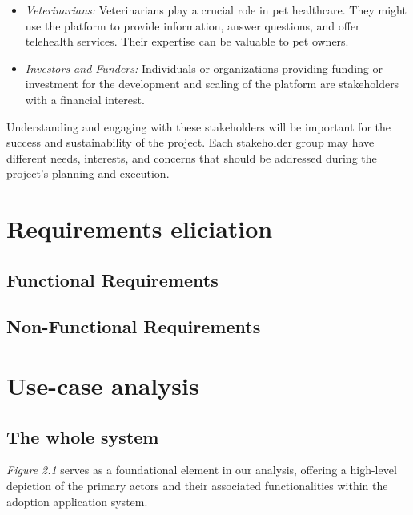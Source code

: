 \begin{itemize}
  \item \textit{Veterinarians:} Veterinarians play a crucial role in pet healthcare. They might use the platform to provide information, answer questions, and offer telehealth services. Their expertise can be valuable to pet owners.
  \item \textit{Investors and Funders:} Individuals or organizations providing funding or investment for the development and scaling of the platform are stakeholders with a financial interest.
\end{itemize}

Understanding and engaging with these stakeholders will be important for the success and sustainability of the project. Each stakeholder group may have different needs, interests, and concerns that should be addressed during the project's planning and execution.

\section{Requirements eliciation}

\subsection{Functional Requirements}



\subsection{Non-Functional Requirements}



\section{Use-case analysis}
\subsection{The whole system}

\textit{Figure 2.1} serves as a foundational element in our analysis, offering a high-level depiction of the primary actors and their associated functionalities within the adoption application system.

